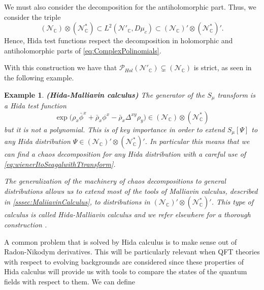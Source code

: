 \documentclass[12pt]{article}%
\newtheorem{example}{Example}%
\begin{document}
 

We must also consider the decomposition for the antiholomorphic part. Thus, we consider the triple  
\begin{equation}
    \label{eq:gelfandtriples}
     (\mathcal{N}_\mathbb{C})\otimes (\mathcal{N}_\mathbb{C}^*) \subset L^2(\mathcal{N}'_{\mathbb{C}}, D\mu_c)\subset (\mathcal{N}_{\mathbb{C}})'\otimes (\mathcal{N}_\mathbb{C}^*)'.
    \end{equation}
     {Hence,} Hida test functions respect the decomposition in holomorphic and antiholomorphic parts of \eqref{eq:ComplexPolinomials}.
    


With this construction we have that $\mathcal{P}_{Hol}(\mathcal{N}'_{\mathbb{C}})\subsetneq (\mathcal{N}_{\mathbb{C}})$ is strict, as seen in the following example. 

\begin{example}{\bf (Hida-Malliavin calculus)}
    \label{ex:HidaMalliavin}
    The generator of the $S_\mu$ transform is a Hida test function
    $$\exp{\big({\rho}_x\bar\phi^x+{\bar\rho_x{\phi}^x}-\bar\rho_x\Delta^{xy}\rho_y\big)}\in (\mathcal{N}_\mathbb{C})\otimes (\mathcal{N}_\mathbb{C}^*)$$
    but it is not a polynomial. This is of key importance in order to extend $S_\mu[\Psi]$ to any Hida distribution $\Psi\in(\mathcal{N}_{\mathbb{C}})'\otimes (\mathcal{N}_\mathbb{C}^*)'$. In particular this means that we can find a chaos decomposition for any Hida distribution with a careful use of \eqref{eq:wienerItoSeagalwithTtransform}.  

    The generalization of the machinery of chaos decompositions to general distributions allows us to extend most of the tools of Malliavin calculus, described in \autoref{sssec:MaliiavinCalculus}, to distributions in $(\mathcal{N}_{\mathbb{C}})'\otimes (\mathcal{N}_\mathbb{C}^*)'$. This type of calculus is called Hida-Malliavin calculus and we refer elsewhere for a thorough construction \cite{Nunno2009,Holden2010}.
\end{example}



A common problem that is solved by Hida calculus is to make sense out of Radon-Nikodym derivatives. This will be particularly relevant when QFT theories with respect to evolving backgrounds are considered since these properties of Hida calculus will provide us with tools to compare the states of the quantum fields with respect to them. We can define 
\end{document}
